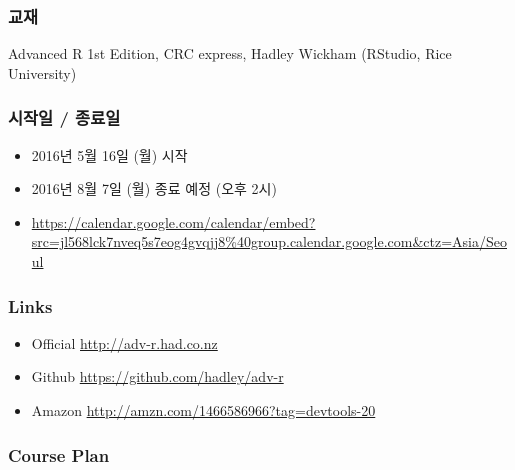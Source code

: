 \documentclass[]{article}
\providecommand{\tightlist}{%
  \setlength{\itemsep}{0pt}\setlength{\parskip}{0pt}}
\begin{document}
\subsubsection{교재}

Advanced R 1st Edition, CRC express, Hadley Wickham (RStudio, Rice
University)

\subsubsection{시작일 / 종료일}\label{-}

\begin{itemize}
\tightlist
\item
  2016년 5월 16일 (월) 시작
\item
  2016년 8월 7일 (월) 종료 예정 (오후 2시)
\item
  \url{https://calendar.google.com/calendar/embed?src=jl568lck7nveq5s7eog4gvqjj8\%40group.calendar.google.com\&ctz=Asia/Seoul}
\end{itemize}

\subsubsection{Links}\label{links}

\begin{itemize}
\tightlist
\item
  Official \textbar{} \url{http://adv-r.had.co.nz}
\item
  Github \textbar{} \url{https://github.com/hadley/adv-r}
\item
  Amazon \textbar{} \url{http://amzn.com/1466586966?tag=devtools-20}
\end{itemize}

\subsubsection{Course Plan}\label{course-plan}
\end{document}
